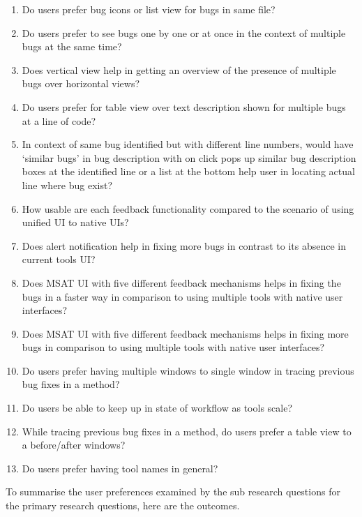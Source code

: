 \begin{enumerate}
	\item Do users prefer bug icons or list view for bugs in same file?
	\item Do users prefer to see bugs one by one or at once in the context of multiple bugs at the same time?
	\item Does vertical view help in getting an overview of the presence of multiple bugs over horizontal views?
	\item Do users prefer for table view over text description shown for multiple bugs at a line of code?
	\item In context of same bug identified but with different line numbers, would have ‘similar bugs’ in bug description with on click pops up similar bug description boxes at the identified line or a list at the bottom help user in locating actual line where bug exist?
	\item How usable are each feedback functionality compared to the scenario of using unified UI to native UIs?
	\item Does alert notification help in fixing more bugs in contrast to its absence in current tools UI?
	\item Does MSAT UI with five different feedback mechanisms helps in fixing the bugs in a faster way in comparison to using multiple tools with native user interfaces?
	\item Does MSAT UI with five different feedback mechanisms helps in fixing more bugs in comparison to using multiple tools with native user interfaces?
	\item Do users prefer having multiple windows to single window in tracing previous bug fixes in a method?
	\item Do users be able to keep up in state of workflow as tools scale?
	\item While tracing previous bug fixes in a method, do users prefer a table view to a before/after windows?
	\item Do users prefer having tool names in general? \\
\end{enumerate}


To summarise the user preferences examined by the sub research questions for the primary research questions, here are the outcomes. \\ \\

